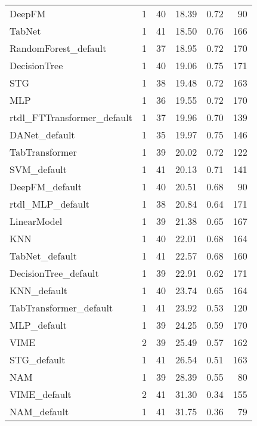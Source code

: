 \begin{tabular}{lrrrrr}
DeepFM                     &            1 &  40 &  18.39 &                     0.72 &    90 \\
TabNet                     &            1 &  41 &  18.50 &                     0.76 &   166 \\
RandomForest_default       &            1 &  37 &  18.95 &                     0.72 &   170 \\
DecisionTree               &            1 &  40 &  19.06 &                     0.75 &   171 \\
STG                        &            1 &  38 &  19.48 &                     0.72 &   163 \\
MLP                        &            1 &  36 &  19.55 &                     0.72 &   170 \\
rtdl_FTTransformer_default &            1 &  37 &  19.96 &                     0.70 &   139 \\
DANet_default              &            1 &  35 &  19.97 &                     0.75 &   146 \\
TabTransformer             &            1 &  39 &  20.02 &                     0.72 &   122 \\
SVM_default                &            1 &  41 &  20.13 &                     0.71 &   141 \\
DeepFM_default             &            1 &  40 &  20.51 &                     0.68 &    90 \\
rtdl_MLP_default           &            1 &  38 &  20.84 &                     0.64 &   171 \\
LinearModel                &            1 &  39 &  21.38 &                     0.65 &   167 \\
KNN                        &            1 &  40 &  22.01 &                     0.68 &   164 \\
TabNet_default             &            1 &  41 &  22.57 &                     0.68 &   160 \\
DecisionTree_default       &            1 &  39 &  22.91 &                     0.62 &   171 \\
KNN_default                &            1 &  40 &  23.74 &                     0.65 &   164 \\
TabTransformer_default     &            1 &  41 &  23.92 &                     0.53 &   120 \\
MLP_default                &            1 &  39 &  24.25 &                     0.59 &   170 \\
VIME                       &            2 &  39 &  25.49 &                     0.57 &   162 \\
STG_default                &            1 &  41 &  26.54 &                     0.51 &   163 \\
NAM                        &            1 &  39 &  28.39 &                     0.55 &    80 \\
VIME_default               &            2 &  41 &  31.30 &                     0.34 &   155 \\
NAM_default                &            1 &  41 &  31.75 &                     0.36 &    79 \\
\bottomrule
\end{tabular}
